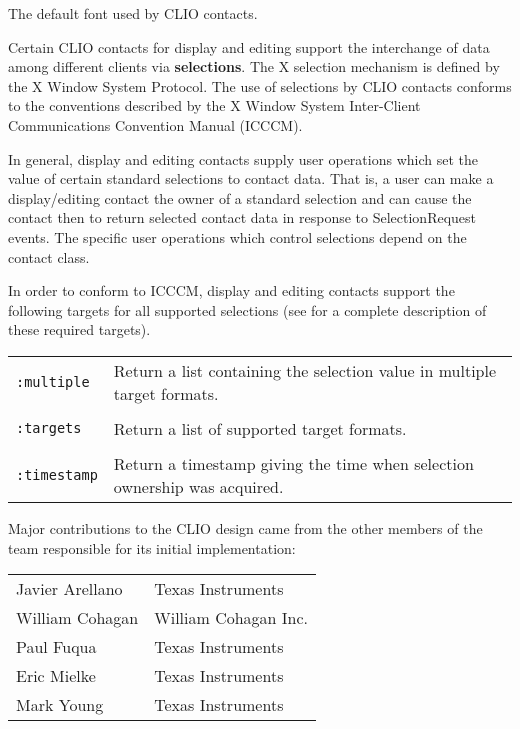 \begin{flushright} \parbox[t]{6.125in}{
The default font used by CLIO contacts.

}\end{flushright}



Certain CLIO contacts for display and editing support the interchange of data
among different clients via {\bf selections}.  The X selection
mechanism is defined by the X Window System Protocol\cite{protocol}.  The use of
selections by CLIO contacts conforms to the conventions described by the X
Window System Inter-Client Communications Convention Manual (ICCCM)\cite{icccm}.

In general, display and editing contacts supply user operations which set the
value of certain standard selections to contact data.  That is, a user can make a
display/editing contact the owner of a standard selection and can cause the
contact then to return selected contact data in response to SelectionRequest
events.  The specific user operations which control selections depend on the
contact class.

In order to conform to ICCCM, display and editing contacts support the following
targets for all supported selections (see \cite{icccm} for a complete
description of these required targets).

\begin{center}
\begin{tabular}{lp{4in}} 
{\tt :multiple} &
                Return a list containing the selection value in multiple target
                formats.\\
\\ 
{\tt :targets} &
                Return a list of supported target formats.\\
\\ 
{\tt :timestamp} &
                Return a timestamp giving the time when selection ownership
                was acquired.\\
\end{tabular}
\end{center}


Major contributions to the CLIO design came from the other members of the team
responsible for its initial implementation:

\begin{center}
\begin{tabular}{ll}
Javier Arellano &       Texas Instruments \\
William Cohagan &       William Cohagan Inc.\\
Paul Fuqua      &       Texas Instruments \\
Eric Mielke     &       Texas Instruments \\
Mark Young      &       Texas Instruments \\
\end{tabular}
\end{center}

